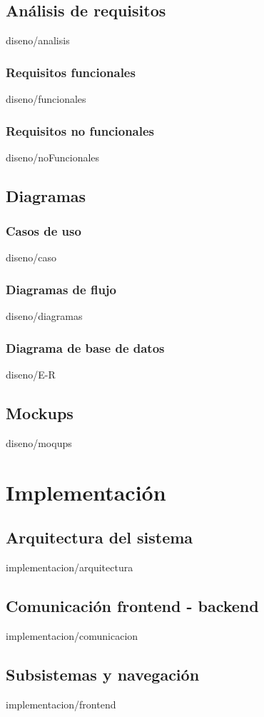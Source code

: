 \documentclass[epsbased,copyright,final,printable,covers,extendedindex,firstnumbered,tfg,gnuplot]{tfgtfmthesisuam}
\begin{document}
  \section{Análisis de requisitos\label{SEC:ANALISIS}}{diseno/analisis}
    \subsection{Requisitos funcionales\label{SEC:FUNCIONALES}}{diseno/funcionales}
    \subsection{Requisitos no funcionales\label{SEC:NOFUNCIONALES}}{diseno/noFuncionales}
  \section{Diagramas\label{SEC:DIAGRAMAS}}{}
    \subsection{Casos de uso}{diseno/caso}
    \subsection{Diagramas de flujo}{diseno/diagramas}
    \subsection{Diagrama de base de datos}{diseno/E-R}
  \section{Mockups\label{SEC:mockups}}{diseno/moqups}

\chapter{Implementación\label{CAP:IMPLEMENTACION}}{}
  \section{Arquitectura del sistema\label{SEC:ARQUITECTURA}}{implementacion/arquitectura}
  \section{Comunicación frontend - backend\label{SEC:TESTS}}{implementacion/comunicacion}
  \section{Subsistemas y navegación\label{SEC:SISTEMAS}}{implementacion/frontend}
\end{document}

